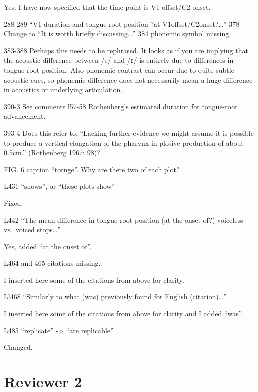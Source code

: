\documentclass[]{article}
\begin{document}
\color{plum}

Yes. I have now specified that the time point is V1 offset/C2 onset.
\color{black}

288-289 ``V1 duration and tongue root position ?at
V1offset/C2onset?\ldots{}'' 378 Change to ``It is worth briefly
discussing\ldots{}'' 384 phonemic symbol missing

383-388 Perhaps this needs to be rephrased. It looks as if you are
implying that the acoustic difference between /e/ and /ɛ/ is entirely
due to differences in tongue-root position. Also phonemic contrast can
occur due to quite subtle acoustic cues, so phonemic difference does not
necessarily mean a huge difference in acoustics or underlying
articulation.

390-3 See comments l57-58 Rothenberg's estimated duration for
tongue-root advancement.

393-4 Does this refer to: ``Lacking further evidence we might assume it
is possible to produce a vertical elongation of the pharynx in plosive
production of about 0.5cm.'' (Rothenberg 1967: 98)?

FIG. 6 caption ``tornge''. Why are there two of each plot?

L431 ``shows'', or ``these plots show''

\color{plum}

Fixed. \color{black}

L442 ``The mean difference in tongue root position (at the onset of?)
voiceless vs.~voiced stops\ldots{}''

\color{plum}

Yes, added ``at the onset of''. \color{black}

L464 and 465 citations missing.

\color{plum}

I inserted here some of the citations from above for clarity.
\color{black}

Ll468 ``Similarly to what (was) previously found for English
(citation)\ldots{}''

\color{plum}

I inserted here some of the citations from above for clarity and I added
``was''. \color{black}

L485 ``replicate'' -\textgreater{} ``are replicable''

\color{plum}

Changed. \color{black}

\hypertarget{reviewer-2}{%
\section{Reviewer 2}\label{reviewer-2}}
\end{document}
